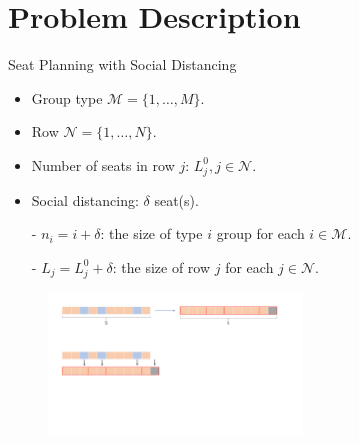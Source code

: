 
\section{Problem Description}
    \frame{\sectionpage}
\begin{frame}{Seat Planning with Social Distancing}
  \begin{itemize}  
    \item Group type $\mathcal{M} = \{1, \ldots, M\}$.
    \item Row $\mathcal{N} = \{1, \ldots, N\}$.
    \item Number of seats in row $j$: $L_j^{0}, j \in \mathcal{N}$.
    \item Social distancing: $\delta$ seat(s).
    \item[-] $n_i = i + \delta$: the size of type $i$ group for each $i \in \mathcal{M}$.
    \item[-] $L_j = L_j^{0} + \delta$: the size of row $j$ for each $j \in \mathcal{N}$.
    \end{itemize}
    
    \begin{figure}[ht]
      \centering
      \includegraphics[width = 0.6\textwidth]{./images/delta.pdf}
  \end{figure}
  \end{frame}

